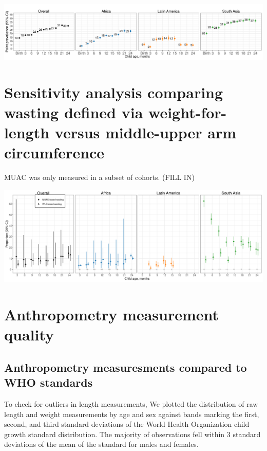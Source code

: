 \documentclass[
  9pt,
]{book}
\begin{document}
\includegraphics[width=58.33in]{figures//wasting/no-kenaba-bw/fig-uw-prev-no-Kenaba-BW}

\hypertarget{muac}{%
\chapter{Sensitivity analysis comparing wasting defined via weight-for-length versus middle-upper arm circumference}\label{muac}}

\raggedright

MUAC was only measured in a subset of cohorts. (FILL IN)

\includegraphics[width=58.33in]{figures//wasting/fig-wast-2-muac-overall_region--allage-primary}

\hypertarget{anthro}{%
\chapter{Anthropometry measurement quality}\label{anthro}}

\raggedright

\hypertarget{anthropometry-measuresments-compared-to-who-standards}{%
\section{Anthropometry measuresments compared to WHO standards}\label{anthropometry-measuresments-compared-to-who-standards}}

To check for outliers in length measurements, We plotted the distribution of raw length and weight measurements by age and sex against bands marking the first, second, and third standard deviations of the World Health Organization child growth standard distribution. The majority of observations fell within 3 standard deviations of the mean of the standard for males and females.
\end{document}
